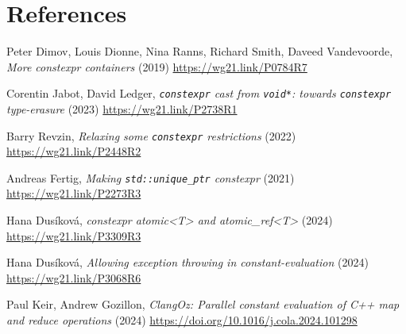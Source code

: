 \documentclass[10pt]{article}
\begin{document}
\section{References}
\renewcommand{\section}[2]{}%
\begin{thebibliography}{9}

    Peter Dimov, Louis Dionne, Nina Ranns, Richard Smith, Daveed Vandevoorde,
    \emph{More constexpr containers} (2019)\newline
    \url{https://wg21.link/P0784R7}

    Corentin Jabot, David Ledger,
    \emph{\texttt{constexpr} cast from \texttt{void*}: towards \texttt{constexpr} type-erasure} (2023)\newline
    \url{https://wg21.link/P2738R1}

    Barry Revzin,
    \emph{Relaxing some \texttt{constexpr} restrictions} (2022)\newline
    \url{https://wg21.link/P2448R2}

    Andreas Fertig,
    \emph{Making \texttt{std::unique\_ptr} constexpr} (2021)\newline
    \url{https://wg21.link/P2273R3}

    Hana Dusíková,
    \emph{constexpr atomic<T> and atomic\_ref<T>} (2024)\newline
    \url{https://wg21.link/P3309R3}

    Hana Dusíková,
    \emph{Allowing exception throwing in constant-evaluation} (2024)\newline
    \url{https://wg21.link/P3068R6}

    Paul Keir, Andrew Gozillon,
    \emph{ClangOz: Parallel constant evaluation of C++ map and reduce operations} (2024)\newline
    \url{https://doi.org/10.1016/j.cola.2024.101298}

\end{thebibliography}
\end{document}
